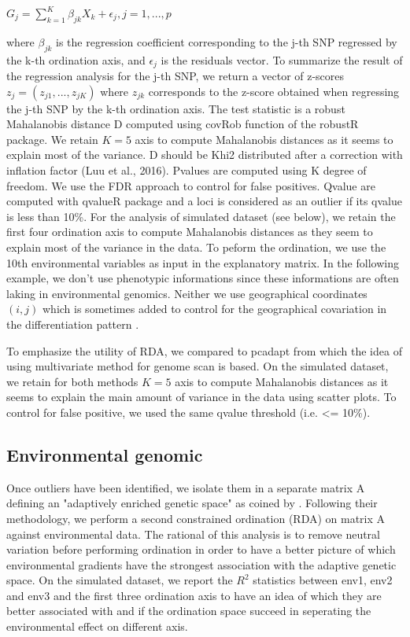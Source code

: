 \documentclass[nogrid]{MBE}%
\begin{document}
$G_j = \sum^{K}_{k=1}\beta_{jk}X_{k}+\epsilon_{j}, j=1,...,p$

where $\beta_{jk}$ is the regression coefficient corresponding to the j-th SNP regressed by the k-th ordination axis, and $\epsilon_{j}$ is the residuals vector. To summarize the result of the regression analysis for the j-th SNP, we return a vector of z-scores $z_{j} = (z_{j1}, ..., z_{jK})$ where $z_{jk}$ corresponds to the z-score obtained when regressing the j-th SNP by the k-th ordination axis.
The test statistic is a robust Mahalanobis distance D computed using covRob function of the robustR package. We retain $K=5$ axis to compute Mahalanobis distances as it seems to explain most of the variance. D should be Khi2 distributed after a correction with inflation factor (Luu et al., 2016). Pvalues are computed using K degree of freedom. We use the FDR approach to control for false positives. Qvalue are computed with qvalueR package and a loci is considered as an outlier if its qvalue is less than 10\%.
For the analysis of simulated dataset (see below), we retain the first four ordination axis to compute Mahalanobis distances  as they seem to explain most of the variance in the data. To peform the ordination, we use the 10th environmental variables as input in the explanatory matrix. In the following example, we don't use phenotypic informations since these informations are often laking in environmental genomics. Neither we use geographical coordinates $(i,j)$ which is sometimes added to control for the geographical covariation in the differentiation pattern \citep{Frichot2013}.

To emphasize the utility of RDA, we compared to pcadapt from which the idea of using multivariate method for genome scan is based. On the simulated dataset, we retain for both methods $K=5$ axis to compute Mahalanobis distances  as it seems to explain the main amount of variance in the data using scatter plots. To control for false positive, we used the same qvalue threshold (i.e. <= 10\%).


\subsection{Environmental genomic}

Once outliers have been identified, we isolate them in a separate matrix A defining an "adaptively enriched genetic space" as coined by \citet{Steane2014a}. Following their methodology, we perform a second constrained ordination (RDA) on matrix A against environmental data. The rational of this analysis is to remove neutral variation before performing ordination in order to have a better picture of which environmental gradients have the strongest association with the adaptive genetic space. On the simulated dataset, we report the $R^2$ statistics between env1, env2 and env3 and the first three ordination axis to have an idea of which they are better associated with and if the ordination space succeed in seperating the environmental effect on different axis.
\end{document}
